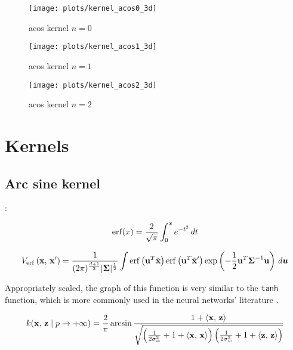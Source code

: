 \begin{figure}
    \texttt{[image: plots/kernel\_acos0\_3d]}
    \caption{acos kernel $n=0$}
    \label{fig:kernel_acos0_3d}
\end{figure}

\begin{figure}
    \texttt{[image: plots/kernel\_acos1\_3d]}
    \caption{acos kernel $n=1$}
\end{figure}

\begin{figure}
    \texttt{[image: plots/kernel\_acos2\_3d]}
    \caption{acos kernel $n=2$}
\end{figure}

\section{Kernels}
\subsection{Arc sine kernel}

\textcite{frenayParameterinsensitiveKernelExtreme2011,williamsComputationInfiniteNeural1998}:


\begin{equation}
    \operatorname{erf}(x) = \frac{2}{\sqrt{\pi}} \int_0^x e^{-t^2} \,dt
\end{equation}


\begin{equation}
    V_{\operatorname{erf}}\left(\mathbf{x},\,\mathbf{x}'\right) =
    \frac{1}{(2\pi)^{\frac{d+1}{2}} |\boldsymbol \Sigma|^{\frac{1}{2}}}
    \int
    \operatorname{erf} \left(\mathbf{u} ^T \tilde {\mathbf{x}} \right)
    \operatorname{erf} \left(\mathbf{u} ^T \tilde {\mathbf{x}} '\right)
    \exp \left(
    -\frac{1}{2} \mathbf{u} ^T \boldsymbol \Sigma^{-1} \mathbf{u}
    \right)
    \,d\boldsymbol u
\end{equation}

Appropriately scaled, the graph of this function is very similar to the
\texttt{tanh} function, which is more commonly used in the neural networks'
literature \cite{williamsComputationInfiniteNeural1998}.

\begin{equation}
    k(\mathbf{x},\,\mathbf{z} \mid p \to + \infty)  = \frac{2}{\pi}
    \arcsin \frac{1 + \left\langle \mathbf{x},\,\mathbf{z} \right\rangle}{\sqrt{
            \left(
            \frac{1}{2\sigma_w^2} + 1 + \left\langle \mathbf{x},\,\mathbf{x} \right\rangle
            \right)
            \left(
            \frac{1}{2\sigma_w^2} + 1 + \left\langle \mathbf{z},\,\mathbf{z} \right\rangle
            \right)
        }}
\end{equation}

